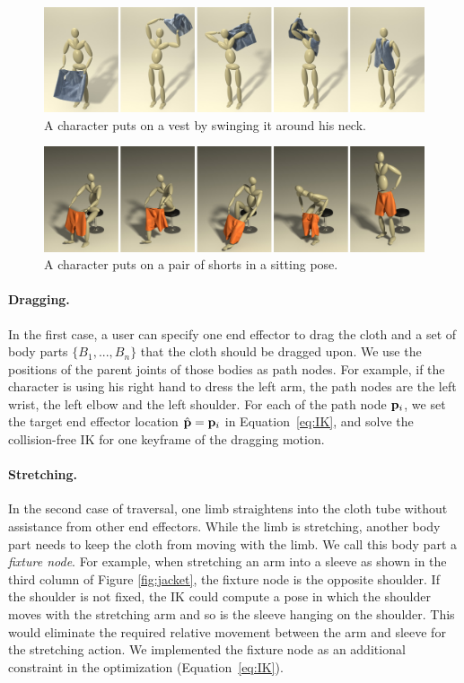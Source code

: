 \begin{figure}[!t]
  \centering
  \includegraphics[width=\textwidth]{images/vest}
  \caption{A character puts on a vest by swinging it around his neck.}
  \label{fig:vest}
\end{figure}

\begin{figure}[!t]
  \centering
  \includegraphics[width=\textwidth]{images/shortsSitting}
  \caption{A character puts on a pair of shorts in a sitting pose.}
  \label{fig:shorts1}
\end{figure}



\paragraph{Dragging.} In the first case, a user can specify one end effector to drag the cloth and a set of body parts $\{B_1 ,..., B_n\}$ that the cloth should be dragged upon. We use the positions of the parent joints of those bodies as path nodes. For example, if the character is using his right hand to dress the left arm, the path nodes are the left wrist, the left elbow and the left shoulder. For each of the path node $\mathbf{p}_i$, we set the target end effector location $\hat{\mathbf{p}}=\mathbf{p}_i$ in Equation~\ref{eq:IK}, and solve the collision-free IK for one keyframe of the dragging motion. 

\paragraph{Stretching.} In the second case of traversal, one limb straightens into the cloth tube without assistance from other end effectors. While the limb is stretching, another body part needs to keep the cloth from moving with the limb. We call this body part a \emph{fixture node}. For example, when stretching an arm into a sleeve as shown in the third column of Figure \ref{fig:jacket}, the fixture node is the opposite shoulder. If the shoulder is not fixed, the IK could compute a pose in which the shoulder moves with the stretching arm and so is the sleeve hanging on the shoulder. This would eliminate the required relative movement between the arm and sleeve for the stretching action. We implemented the fixture node as an additional constraint in the optimization (Equation~\ref{eq:IK}).

